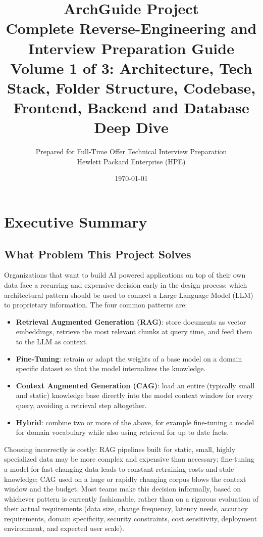 \documentclass[11pt,a4paper]{report}
\title{\Huge \textbf{ArchGuide Project} \\[0.4cm] \Large Complete Reverse-Engineering and Interview Preparation Guide \\[0.6cm] \large Volume 1 of 3: Architecture, Tech Stack, Folder Structure, Codebase, Frontend, Backend and Database Deep Dive}
\author{Prepared for Full-Time Offer Technical Interview Preparation \\ Hewlett Packard Enterprise (HPE)}
\date{\today}
\begin{document}
\maketitle

\tableofcontents

\chapter{Executive Summary}

\section{What Problem This Project Solves}

Organizations that want to build AI powered applications on top of their own data face a recurring and expensive decision early in the design process: which architectural pattern should be used to connect a Large Language Model (LLM) to proprietary information. The four common patterns are:

\begin{itemize}[leftmargin=*]
  \item \textbf{Retrieval Augmented Generation (RAG)}: store documents as vector embeddings, retrieve the most relevant chunks at query time, and feed them to the LLM as context.
  \item \textbf{Fine-Tuning}: retrain or adapt the weights of a base model on a domain specific dataset so that the model internalizes the knowledge.
  \item \textbf{Context Augmented Generation (CAG)}: load an entire (typically small and static) knowledge base directly into the model context window for every query, avoiding a retrieval step altogether.
  \item \textbf{Hybrid}: combine two or more of the above, for example fine-tuning a model for domain vocabulary while also using retrieval for up to date facts.
  \end{itemize}

Choosing incorrectly is costly: RAG pipelines built for static, small, highly specialized data may be more complex and expensive than necessary; fine-tuning a model for fast changing data leads to constant retraining costs and stale knowledge; CAG used on a huge or rapidly changing corpus blows the context window and the budget. Most teams make this decision informally, based on whichever pattern is currently fashionable, rather than on a rigorous evaluation of their actual requirements (data size, change frequency, latency needs, accuracy requirements, domain specificity, security constraints, cost sensitivity, deployment environment, and expected user scale).
\end{document}
